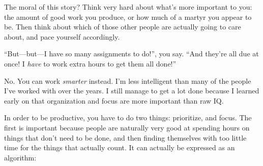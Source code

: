 \documentclass{report}
\begin{document}
The moral of this story?  Think very hard about what's more important
to you: the amount of good work you produce, or how much of a martyr
you appear to be.  Then think about which of those other people are
actually going to care about, and pace yourself accordingly.


``But---but---I have so many assignments to do!'', you say.  ``And
they're all due at once!  I \emph{have} to work extra hours to get
them all done!''

No.  You can work \emph{smarter} instead.  I'm less intelligent than
many of the people I've worked with over the years.  I still manage to
get a lot done because I learned early on that organization and focus
are more important than raw IQ.

In order to be productive, you have to do two things: prioritize, and
focus.  The first is important because people are naturally very good
at spending hours on things that don't need to be done, and then
finding themselves with too little time for the things that actually
count.  It can actually be expressed as an algorithm:
\end{document}
